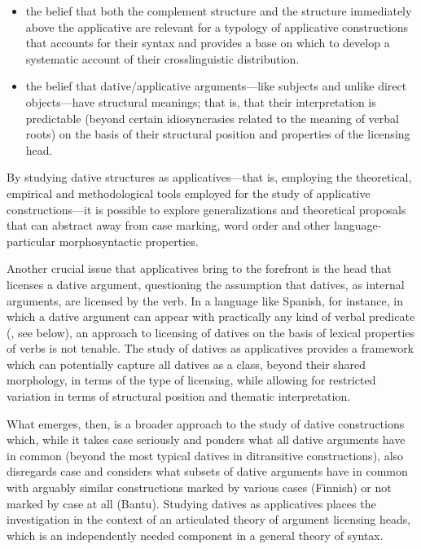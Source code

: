 \documentclass[output=paper,colorlinks,citecolor=brown,nonflat]{./langscibook}
\begin{document}
\begin{itemize}
\item \begin{styleListParagraph}
the belief that both the complement structure and the structure immediately above the applicative are relevant for a typology of applicative constructions that accounts for their syntax and provides a base on which to develop a systematic account of their crosslinguistic distribution.
\end{styleListParagraph}
\item \begin{styleListParagraph}
the belief that dative/applicative arguments—like subjects and unlike direct objects—have structural meanings; that is, that their interpretation is predictable (beyond certain idiosyncrasies related to the meaning of verbal roots) on the basis of their structural position and properties of the licensing head.
\end{styleListParagraph}
\end{itemize}

By studying dative structures as applicatives—that is, employing the theoretical, empirical and methodological tools employed for the study of applicative constructions—it is possible to explore generalizations and theoretical proposals that can abstract away from case marking, word order and other language-particular morphosyntactic properties.

Another crucial issue that applicatives bring to the forefront is the head that licenses a dative argument, questioning the assumption that datives, as internal arguments, are licensed by the verb. In a language like Spanish, for instance, in which a dative argument can appear with practically any kind of verbal predicate (\citealt{Cuervo2003}, see  below), an approach to licensing of datives on the basis of lexical properties of verbs is not tenable. The study of datives as applicatives provides a framework which can potentially capture all datives as a class, beyond their shared morphology, in terms of the type of licensing, while allowing for restricted variation in terms of structural position and thematic interpretation.

What emerges, then, is a broader approach to the study of dative constructions which, while it takes case seriously and ponders what all dative arguments have in common (beyond the most typical datives in ditransitive constructions), also disregards case and considers what subsets of dative arguments have in common with arguably similar constructions marked by various cases (Finnish) or not marked by case at all (Bantu).
Studying datives as applicatives places the investigation in the context of an articulated theory of argument licensing heads, which is an independently needed component in a general theory of syntax.
\end{document}

